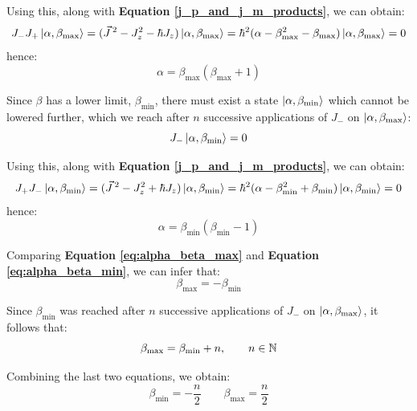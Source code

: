 Using this, along with \textbf{Equation \ref{j_p_and_j_m_products}}, we can obtain:
\begin{equation}
    J_-J_+\ket{\alpha,\beta_\text{max}} = (\vec{J}\,^2 - J_z^2 - \hbar J_z)\ket{\alpha,\beta_\text{max}} = \hbar^2(\alpha-\beta_\text{max}^2 - \beta_\text{max})\ket{\alpha,\beta_\text{max}} = 0
\end{equation}
hence:
\begin{equation}\label{eq:alpha_beta_max}
    \alpha = \beta_\text{max}(\beta_\text{max} + 1)
\end{equation}

Since $\beta$ has a lower limit, $\beta_\text{min}$, there must exist a state $\ket{\alpha, \beta_\text{min}}$ which cannot be lowered further, which we reach after $n$ successive applications of $J_-$ on $\ket{\alpha, \beta_\text{max}}$:
\begin{equation} 
    J_-\ket{\alpha, \beta_\text{min}} = 0
\end{equation}

Using this, along with \textbf{Equation \ref{j_p_and_j_m_products}}, we can obtain:
\begin{equation}
    J_+J_-\ket{\alpha,\beta_\text{min}} = (\vec{J}\,^2 - J_z^2 + \hbar J_z)\ket{\alpha,\beta_\text{min}} = \hbar^2(\alpha-\beta_\text{min}^2 + \beta_\text{min})\ket{\alpha,\beta_\text{min}} = 0
\end{equation}
hence:
\begin{equation} \label{eq:alpha_beta_min}
    \alpha = \beta_\text{min}(\beta_\text{min} - 1)
\end{equation}

Comparing \textbf{Equation \ref{eq:alpha_beta_max}} and \textbf{Equation \ref{eq:alpha_beta_min}}, we can infer that:
\begin{equation}
    \beta_\text{max} = -\beta_\text{min}
\end{equation}

Since $\beta_\text{min}$ was reached after $n$ successive applications of $J_-$ on $\ket{\alpha, \beta_\text{max}}$, it follows that:
\begin{equation}
    \beta_\text{max} = \beta_\text{min} + n, \qquad n\in \mathbb{N}
\end{equation}

Combining the last two equations, we obtain:
\begin{equation}
    \beta_\text{min} = -\frac{n}{2}\qquad \beta_\text{max} = \frac{n}{2}
\end{equation}

